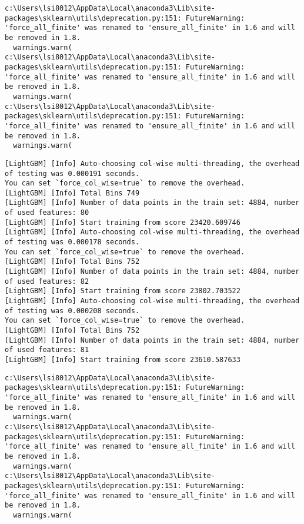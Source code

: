 \documentclass[
  letterpaper,
  DIV=11,
  numbers=noendperiod]{scrreprt}
\begin{document}
\begin{verbatim}
c:\Users\lsi8012\AppData\Local\anaconda3\Lib\site-packages\sklearn\utils\deprecation.py:151: FutureWarning: 'force_all_finite' was renamed to 'ensure_all_finite' in 1.6 and will be removed in 1.8.
  warnings.warn(
c:\Users\lsi8012\AppData\Local\anaconda3\Lib\site-packages\sklearn\utils\deprecation.py:151: FutureWarning: 'force_all_finite' was renamed to 'ensure_all_finite' in 1.6 and will be removed in 1.8.
  warnings.warn(
c:\Users\lsi8012\AppData\Local\anaconda3\Lib\site-packages\sklearn\utils\deprecation.py:151: FutureWarning: 'force_all_finite' was renamed to 'ensure_all_finite' in 1.6 and will be removed in 1.8.
  warnings.warn(
\end{verbatim}

\begin{verbatim}
[LightGBM] [Info] Auto-choosing col-wise multi-threading, the overhead of testing was 0.000191 seconds.
You can set `force_col_wise=true` to remove the overhead.
[LightGBM] [Info] Total Bins 749
[LightGBM] [Info] Number of data points in the train set: 4884, number of used features: 80
[LightGBM] [Info] Start training from score 23420.609746
[LightGBM] [Info] Auto-choosing col-wise multi-threading, the overhead of testing was 0.000178 seconds.
You can set `force_col_wise=true` to remove the overhead.
[LightGBM] [Info] Total Bins 752
[LightGBM] [Info] Number of data points in the train set: 4884, number of used features: 82
[LightGBM] [Info] Start training from score 23802.703522
[LightGBM] [Info] Auto-choosing col-wise multi-threading, the overhead of testing was 0.000208 seconds.
You can set `force_col_wise=true` to remove the overhead.
[LightGBM] [Info] Total Bins 752
[LightGBM] [Info] Number of data points in the train set: 4884, number of used features: 81
[LightGBM] [Info] Start training from score 23610.587633
\end{verbatim}

\begin{verbatim}
c:\Users\lsi8012\AppData\Local\anaconda3\Lib\site-packages\sklearn\utils\deprecation.py:151: FutureWarning: 'force_all_finite' was renamed to 'ensure_all_finite' in 1.6 and will be removed in 1.8.
  warnings.warn(
c:\Users\lsi8012\AppData\Local\anaconda3\Lib\site-packages\sklearn\utils\deprecation.py:151: FutureWarning: 'force_all_finite' was renamed to 'ensure_all_finite' in 1.6 and will be removed in 1.8.
  warnings.warn(
c:\Users\lsi8012\AppData\Local\anaconda3\Lib\site-packages\sklearn\utils\deprecation.py:151: FutureWarning: 'force_all_finite' was renamed to 'ensure_all_finite' in 1.6 and will be removed in 1.8.
  warnings.warn(
\end{verbatim}
\end{document}
